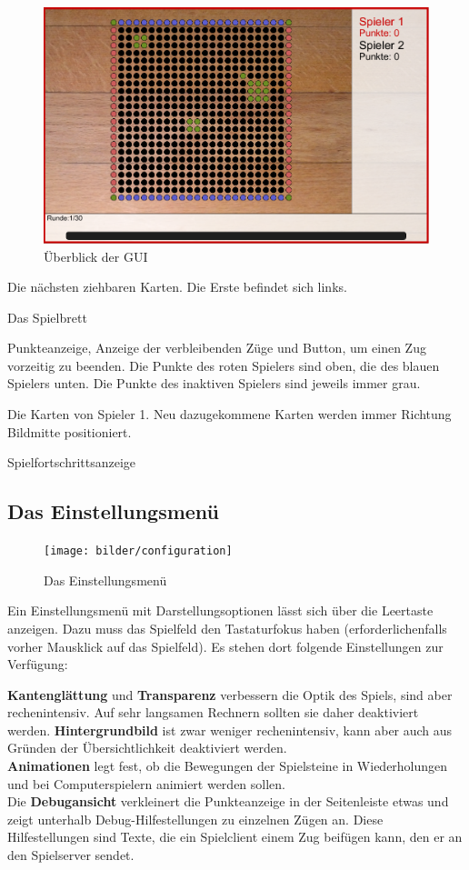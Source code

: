 \documentclass[a4paper, ngerman]{scrartcl}
\begin{document}
	 \begin{figure}[h!]
		\centering		
		\includegraphics[scale = 0.3]{bilder/gui}
		\caption{Überblick der GUI}
		\label{fig:GUI}
	\end{figure}
	
\begin{compactenum}[a)] \item Die nächsten ziehbaren Karten. Die Erste befindet
sich links.
\item Das Spielbrett \item Punkteanzeige, Anzeige der verbleibenden Züge und
Button, um einen Zug vorzeitig zu beenden. Die Punkte des roten Spielers sind
oben, die des blauen Spielers unten. Die Punkte des inaktiven Spielers sind
jeweils immer grau.
\item Die Karten von Spieler 1. Neu dazugekommene Karten werden immer Richtung
Bildmitte positioniert.
\item Spielfortschrittsanzeige
	\end{compactenum}
	
\subsection{Das Einstellungsmenü}
	 \begin{figure}[h]
		\centering
		\texttt{[image: bilder/configuration]}
		\caption{Das Einstellungsmenü}
		\label{fig:Configuration}
	\end{figure}
	
	Ein Einstellungsmenü mit Darstellungsoptionen lässt
sich über die Leertaste anzeigen. Dazu muss das
Spielfeld den Tastaturfokus haben (erforderlichenfalls
vorher Mausklick auf das Spielfeld). Es stehen dort
folgende Einstellungen zur Verfügung:

\textbf{Kantenglättung} und \textbf{Transparenz} verbessern die Optik des
Spiels, sind aber rechenintensiv. Auf sehr langsamen Rechnern sollten sie daher
deaktiviert werden. \textbf{Hintergrundbild} ist zwar weniger rechenintensiv,
kann aber auch aus Gründen der Übersichtlichkeit deaktiviert werden.\\
\textbf{Animationen} legt fest, ob die Bewegungen der Spielsteine in
Wiederholungen und bei Computerspielern animiert werden sollen.\\
Die \textbf{Debugansicht} verkleinert die Punkteanzeige in der Seitenleiste
etwas und zeigt unterhalb Debug-Hilfestellungen zu einzelnen Zügen an. Diese
Hilfestellungen sind Texte, die ein Spielclient einem Zug beifügen kann, den er
an den Spielserver sendet.
	
\end{document}
